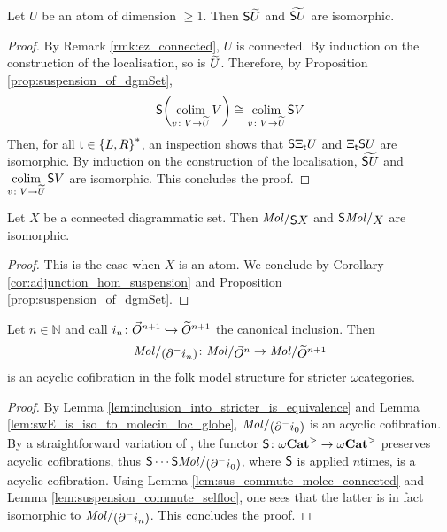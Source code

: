 \begin{lem} \label{lem:suspension_commute_selfloc}
    Let \( U \) be an atom of dimension \( \geq 1 \).
    Then \( \mathsf{S}{\widetilde{U}} \) and \( \widetilde{\mathsf{S}{U}} \) are isomorphic. 
\end{lem}
\begin{proof}
    By Remark \ref{rmk:ez_connected}, \( U \) is connected.
    By induction on the construction of the localisation, so is \( \widetilde{U} \).
    Therefore, by Proposition \ref{prop:suspension_of_dgmSet}, 
    \begin{equation*}
        \mathsf{S}{\left(\operatorname*{colim}_{v \colon V \to \widetilde{U}} V\right)} \cong \operatorname*{colim}_{v \colon V \to \widetilde{U}} \mathsf{S}{V}
    \end{equation*}
    Then, for all \( \mathsf{t} \in \left\{ {L, R} \right\}^* \), an inspection shows that \( \mathsf{S}{\Xi_{\mathsf{t}}U} \) and \( \Xi_{\mathsf{t}} \mathsf{S}{U} \) are isomorphic.
    By induction on the construction of the localisation, \( \widetilde{\mathsf{S}{U}} \) and \( \operatorname*{colim}\limits_{v \colon V \to \widetilde{U}} \mathsf{S}{V} \) are isomorphic.    
    This concludes the proof.
\end{proof}

\begin{lem} \label{lem:sus_commute_molec_connected}
    Let \( X \) be a connected diagrammatic set.
    Then \( \molecin{\sus{X}} \) and \( \sus{\molecin{X}} \) are isomorphic.
\end{lem}
\begin{proof}
    This is the case when \( X \) is an atom. 
    We conclude by Corollary \ref{cor:adjunction_hom_suspension} and Proposition \ref{prop:suspension_of_dgmSet}.
\end{proof}

\begin{prop} \label{prop:walking_eq_of_dim_n}
    Let \( n \in \mathbb{N} \) and call \( i_n \colon \vec{O}^{n + 1} \hookrightarrow \widetilde{O}^{n + 1} \) the canonical inclusion.
    Then 
    \begin{equation*}
        \molecin{(\bd{}{-} i_n)} \colon \molecin{\dglobe{n}} \to \molecin{\rglobe{n + 1}} 
    \end{equation*}
    is an acyclic cofibration in the folk model structure for stricter \( \omega \)\nbd categories.
\end{prop}
\begin{proof}
    By Lemma \ref{lem:inclusion_into_stricter_is_equivalence} and Lemma \ref{lem:swE_is_iso_to_molecin_loc_globe}, \( \molecin{(\bd{}{-} i_0)} \) is an acyclic cofibration.
    By a straightforward variation of \cite[Proposition 2.8]{hadzihasanovic2024model}, the functor \( \mathsf{S}{} \colon {\omega\mathbf{Cat}}^> \to {\omega\mathbf{Cat}}^> \) preserves acyclic cofibrations, thus \( \sus{}\cdots\sus{\molecin{(\bd{}{-} i_0)}} \), where \( \mathsf{S}{} \) is applied \( n \)\nbd times, is a acyclic cofibration.
    Using Lemma \ref{lem:sus_commute_molec_connected} and Lemma \ref{lem:suspension_commute_selfloc}, one sees that the latter is in fact isomorphic to \( \molecin{(\bd{}{-} i_n)} \).
    This concludes the proof.
\end{proof}


